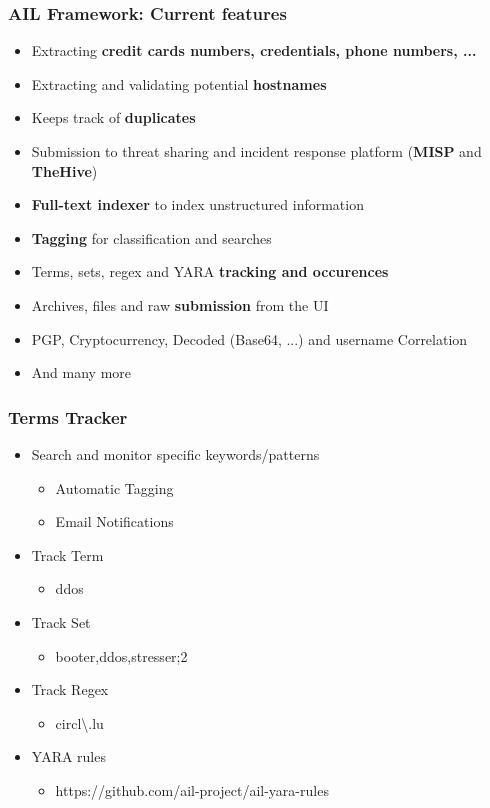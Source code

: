 \documentclass{beamer}
\begin{document}
\begin{frame}
    \frametitle{AIL Framework: Current features}
    \begin{itemize}
        \item Extracting \textbf{credit cards numbers, credentials, phone numbers, ...}
        \item Extracting and validating potential \textbf{hostnames}
        \item Keeps track of \textbf{duplicates}
        \item Submission to threat sharing and incident response platform (\textbf{MISP} and \textbf{TheHive})
        \item \textbf{Full-text indexer} to index unstructured information
        \item \textbf{Tagging} for classification and searches
        \item Terms, sets, regex and YARA \textbf{tracking and occurences}
        \item Archives, files and raw \textbf{submission} from the UI
        \item PGP, Cryptocurrency, Decoded (Base64, ...) and username Correlation
        \item And many more
    \end{itemize}
\end{frame}


\begin{frame}
    \frametitle{Terms Tracker}
        \begin{itemize}
        	\item Search and monitor specific keywords/patterns
        	\begin{itemize}
            	\item Automatic Tagging
            	\item Email Notifications
            \end{itemize}
            \item Track Term
            \begin{itemize}
            	\item ddos
            \end{itemize}
            \item Track Set
            \begin{itemize}
            	\item booter,ddos,stresser;2
            \end{itemize}
            \item Track Regex
            \begin{itemize}
            	\item circl\textbackslash.lu
            \end{itemize}
            \item YARA rules
            	\begin{itemize}
            	\item https://github.com/ail-project/ail-yara-rules
            \end{itemize}
        \end{itemize}
\end{frame}
\end{document}
